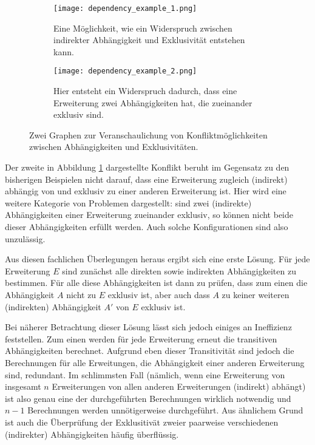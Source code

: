   \begin{figure}
		\centering
		\begin{subfigure}[a]{0.4\linewidth}
			\texttt{[image: dependency\_example\_1.png]}
      		\caption{Eine Möglichkeit, wie ein Widerspruch zwischen indirekter Abhängigkeit und Exklusivität entstehen kann.}
		\end{subfigure}
		\begin{subfigure}[a]{0.4\linewidth}
			\texttt{[image: dependency\_example\_2.png]}
      		\caption{Hier entsteht ein Widerspruch dadurch, dass eine Erweiterung zwei Abhängigkeiten hat, die zueinander exklusiv sind.}
		\end{subfigure}
		\caption{Zwei Graphen zur Veranschaulichung von Konfliktmöglichkeiten zwischen Abhängigkeiten und Exklusivitäten.}
		\label{fig:impl:dependency_conflict_examples}
  \end{figure}

Der zweite in Abbildung \ref{fig:impl:dependency_conflict_examples} dargestellte Konflikt beruht im Gegensatz zu den bisherigen Beispielen nicht darauf, dass eine Erweiterung zugleich (indirekt) abhängig von und exklusiv zu einer anderen Erweiterung ist. Hier wird eine weitere Kategorie von Problemen dargestellt: sind zwei (indirekte) Abhängigkeiten einer Erweiterung zueinander exklusiv, so können nicht beide dieser Abhängigkeiten erfüllt werden. Auch solche Konfigurationen sind also unzulässig.

Aus diesen fachlichen Überlegungen heraus ergibt sich eine erste Lösung. Für jede Erweiterung $E$ sind zunächst alle direkten sowie indirekten Abhängigkeiten zu bestimmen. Für alle diese Abhängigkeiten ist dann zu prüfen, dass zum einen die Abhängigkeit $A$ nicht zu $E$ exklusiv ist, aber auch dass $A$ zu keiner weiteren (indirekten) Abhängigkeit $A'$ von $E$ exklusiv ist.

Bei näherer Betrachtung dieser Lösung lässt sich jedoch einiges an Ineffizienz feststellen. Zum einen werden für jede Erweiterung erneut die transitiven Abhängigkeiten berechnet. Aufgrund eben dieser Transitivität sind jedoch die Berechnungen für alle Erweitungen, die Abhängigkeit einer anderen Erweiterung sind, redundant. Im schlimmsten Fall (nämlich, wenn eine Erweiterung von insgesamt $n$ Erweiterungen von allen anderen Erweiterungen (indirekt) abhängt) ist also genau eine der durchgeführten Berechnungen wirklich notwendig und $n - 1$ Berechnungen werden unnötigerweise durchgeführt. Aus ähnlichem Grund ist auch die Überprüfung der Exklusitivät zweier paarweise verschiedenen (indirekter) Abhängigkeiten häufig überflüssig.

